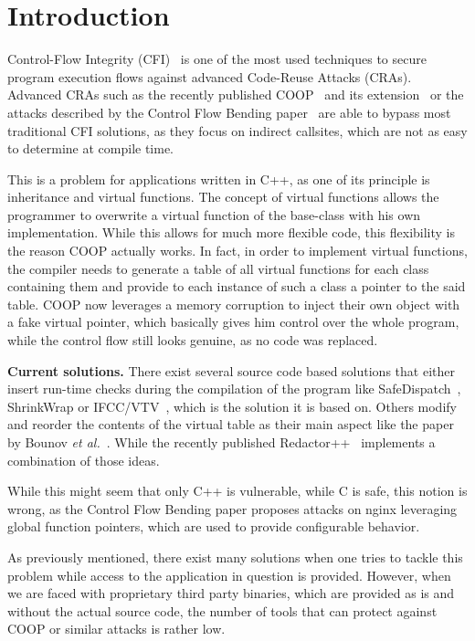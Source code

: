 \section{Introduction}
\label{chapter:Introduction}

Control-Flow Integrity (CFI)~\cite{abadi:cfi2, abadi:cfi} is one of the most used techniques to secure program execution 
flows against advanced Code-Reuse Attacks (CRAs). Advanced CRAs such as the recently published COOP~\cite{schuster:coop} 
and its extension~\cite{crane:readactor++} or the attacks described by the Control Flow Bending paper~\cite{carlini:bending}
are able to bypass most traditional CFI solutions, as they focus on indirect callsites, which are not as easy to determine at compile time.

This is a problem for applications written in C++, as one of its principle is inheritance and virtual functions. 
The concept of virtual functions allows the programmer to overwrite a virtual function of the base-class with his
own implementation. While this allows for much more flexible code, this flexibility is the reason COOP actually 
works. In fact, in order to implement virtual functions, the compiler needs to generate a table of all
virtual functions for each class containing them and provide to each instance of such a class a pointer
to the said table. COOP now leverages a memory corruption to inject their own object with a fake virtual pointer, 
which basically gives him control over the whole program, while the control flow still looks genuine, as no 
code was replaced. 

\textbf{Current solutions.} There exist several source code based solutions that either insert run-time checks during the compilation of 
the program like SafeDispatch~\cite{safedispatch:jang}, ShrinkWrap \cite{haller:shrinkwrap} or IFCC/VTV~\cite{vtv:tice}, 
which is the solution it is based on. Others modify and reorder the contents of the virtual table as their main 
aspect like the paper by Bounov \textit{et al.}~\cite{bounov:interleaving}. While the recently published Redactor++~\cite{crane:readactor++}
implements a combination of those ideas.

While this might seem that only C++ is vulnerable, while C is safe, this notion is wrong, as the 
Control Flow Bending paper \cite{carlini:bending} proposes attacks on nginx leveraging global 
function pointers, which are used to provide configurable behavior.

As previously mentioned, there exist many solutions when one tries to tackle this problem while access
to the application in question is provided. However, when we are faced with proprietary third party 
binaries, which are provided as is and without the actual source code, the number of tools that can
protect against COOP or similar attacks is rather low.

